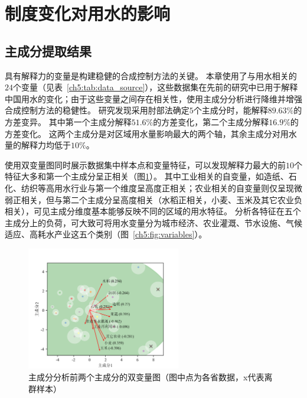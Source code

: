 

\section{制度变化对用水的影响}

\subsection{主成分提取结果}

具有解释力的变量是构建稳健的合成控制方法的关键。
本章使用了与用水相关的$24$个变量（见表~\ref{ch5:tab:data_source}），这些数据集在先前的研究中已用于解释中国用水的变化\cite{zhou2020}；由于这些变量之间存在相关性，使用主成分分析进行降维并增强合成控制方法的稳健性。
研究发现采用肘部法确定$5$个主成分时，能解释$89.63\%$的方差变异。
其中第一个主成分解释$51.6\%$的方差变化，第二个主成分解释$16.9\%$的方差变化。
这两个主成分是对区域用水量影响最大的两个轴，其余主成分对用水量的解释力均低于$10\%$。


使用双变量图同时展示数据集中样本点和变量特征，可以发现解释力最大的前$10$个特征大多和第一个主成分呈正相关（图\ref{ch5:fig:biplot}）。
其中工业相关的自变量，如造纸、石化、纺织等高用水行业与第一个维度呈高度正相关；农业相关的自变量则仅呈现微弱正相关，但与第二个主成分呈高度相关（水稻正相关，小麦、玉米及其它农业负相关），可见主成分维度基本能够反映不同的区域的用水特征。
分析各特征在五个主成分上的负荷，可大致可将用水变量分为城市经济、农业灌溉、节水设施、气候适应、高耗水产业这五个类别（图~\ref{ch5:fig:variables}）。


\begin{figure}[!h]
    \centering
    \includegraphics[width=0.6\textwidth]{img/ch5/ch5_biplot.png}
    \caption[主成分分析前两个主成分的双变量图]{主成分分析前两个主成分的双变量图（图中点为各省数据，x代表离群样本）}\label{ch5:fig:biplot}
\end{figure}


